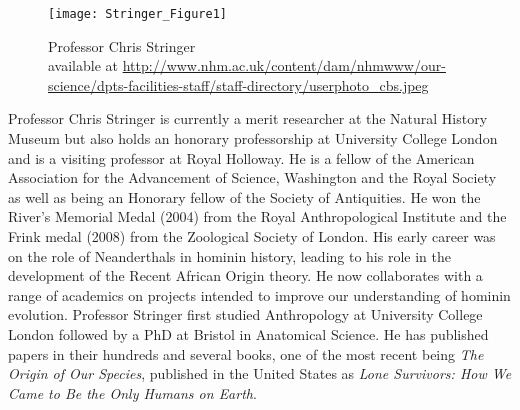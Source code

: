 \documentclass{ijsra}
\begin{document}
\IJSRAopening
\begin{figure}[!b]
	\texttt{[image: Stringer\_Figure1]}
	\caption{Professor Chris Stringer
	{\normalfont\scriptsize\\ available at \url{http://www.nhm.ac.uk/content/dam/nhmwww/our-science/dpts-facilities-staff/staff-directory/userphoto_cbs.jpeg}
                  }}
	\label{fig:Stringer_Figure1}
\end{figure}%
Professor Chris Stringer is currently a merit researcher at the Natural History Museum but also holds
an honorary professorship at University College London and is a visiting professor at Royal Holloway.
He is a fellow of the American Association for the Advancement of Science, Washington and the Royal Society as well as
being an Honorary fellow of the Society of Antiquities. 
He won the River’s Memorial Medal (2004) from the Royal Anthropological Institute and the Frink medal (2008) from
the Zoological Society of London. His early career was on the role of Neanderthals in hominin history,
leading to his role in the development of the Recent African Origin theory.
He now collaborates with a range of academics on projects intended to improve our understanding of hominin evolution.
Professor Stringer first studied Anthropology at University College London followed by a PhD at Bristol in Anatomical Science.
He has published papers in their hundreds and several books, one of the most recent being \emph{The Origin of Our Species},
published in the United States as \emph{Lone Survivors: How We Came to Be the Only Humans on Earth}.
\end{document}
